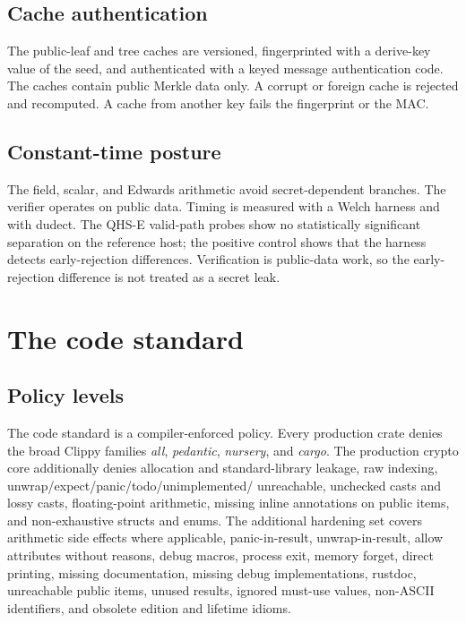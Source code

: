 \documentclass[11pt,a4paper]{article}
\theoremstyle{remark}
\begin{document}
\subsection{Cache authentication}

The public-leaf and tree caches are versioned, fingerprinted with a
derive-key value of the seed, and authenticated with a keyed message
authentication code. The caches contain public Merkle data only. A corrupt or
foreign cache is rejected and recomputed. A cache from another key fails the
fingerprint or the MAC.

\subsection{Constant-time posture}

The field, scalar, and Edwards arithmetic avoid secret-dependent branches. The
verifier operates on public data. Timing is measured with a Welch harness and
with dudect. The QHS-E valid-path probes show no statistically significant
separation on the reference host; the positive control shows that the harness
detects early-rejection differences. Verification is public-data work, so the
early-rejection difference is not treated as a secret leak.

\section{The code standard}

\subsection{Policy levels}

The code standard is a compiler-enforced policy. Every production crate denies
the broad Clippy families \emph{all}, \emph{pedantic}, \emph{nursery}, and
\emph{cargo}. The production crypto core additionally denies allocation and
standard-library leakage, raw indexing, unwrap/expect/panic/todo/unimplemented/
unreachable, unchecked casts and lossy casts, floating-point arithmetic, missing
inline annotations on public items, and non-exhaustive structs and enums. The
additional hardening set covers arithmetic side effects where applicable,
panic-in-result, unwrap-in-result, allow attributes without reasons, debug
macros, process exit, memory forget, direct printing, missing documentation,
missing debug implementations, rustdoc, unreachable public items, unused
results, ignored must-use values, non-ASCII identifiers, and obsolete edition
and lifetime idioms.
\end{document}
